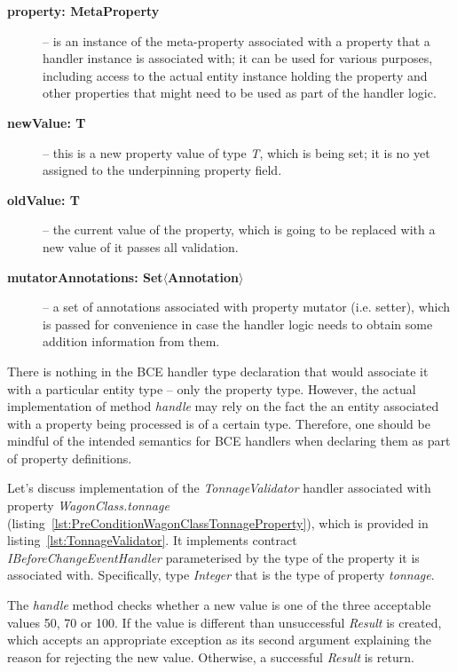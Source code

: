   \begin{description}
    \item[\textbf{property: MetaProperty}] -- is an instance of the meta-property associated with a property that a handler instance is associated with; it can be used for various purposes, including access to the actual entity instance holding the property and other properties that might need to be used as part of the handler logic.
    \item[\textbf{newValue: T}] -- this is a new property value of type \emph{T}, which is being set; it is no yet assigned to the underpinning property field.
    \item[\textbf{oldValue: T}] -- the current value of the property, which is going to be replaced with a new value of it passes all validation.
    \item[\textbf{mutatorAnnotations: Set$\langle$Annotation$\rangle$}] -- a set of annotations associated with property mutator (i.e. setter), which is passed for convenience in case the handler logic needs to obtain some addition information from them.
   \end{description}
  
  There is nothing in the BCE handler type declaration that would associate it with a particular entity type -- only the property type.
  However, the actual implementation of method \emph{handle} may rely on the fact the an entity associated with a property being processed is of a certain type.
  Therefore, one should be mindful of the intended semantics for BCE handlers when declaring them as part of property definitions.

  Let's discuss implementation of the \emph{TonnageValidator} handler associated with property \emph{WagonClass.tonnage} (listing~\ref{lst:PreConditionWagonClassTonnageProperty}), which is provided in listing~\ref{lst:TonnageValidator}.
  It implements contract \emph{IBeforeChangeEventHandler} parameterised by the type of the property it is associated with.
  Specifically, type \emph{Integer} that is the type of property \emph{tonnage}.
  
  The \emph{handle} method checks whether a new value is one of the three acceptable values 50, 70 or 100.
  If the value is different than unsuccessful \emph{Result} is created, which accepts an appropriate exception as its second argument explaining the reason for rejecting the new value.
  Otherwise, a successful \emph{Result} is return.

